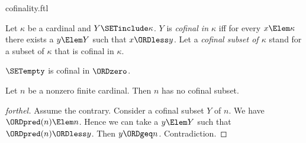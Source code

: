 \documentclass{stex}
\begin{document}
\begin{smodule}{cofinality.ftl}

\begin{definition}[forthel]
  Let $\kappa$ be a cardinal and $Y \SETinclude \kappa$.
  $Y$ is \emph{cofinal in $\kappa$} iff for every $x \Elem \kappa$ there exists a $y \Elem Y$ such that $x \ORDless y$.
  Let a \emph{cofinal subset of $\kappa$} stand for a subset of $\kappa$ that is cofinal in $\kappa$.
\end{definition}

\begin{proposition}[forthel]
  $\SETempty$ is cofinal in $\ORDzero$.
\end{proposition}

\begin{proposition}[forthel]
  Let $n$ be a nonzero finite cardinal.
  Then $n$ has no cofinal subset.
\end{proposition}
\begin{proof}[forthel]
  Assume the contrary.
  Consider a cofinal subset $Y$ of $n$.
  We have $\ORDpred(n) \Elem n$.
  Hence we can take a $y \Elem Y$ such that $\ORDpred(n) \ORDless y$.
  Then $y \ORDgeq n$.
  Contradiction.
\end{proof}
\end{smodule}
\end{document}
